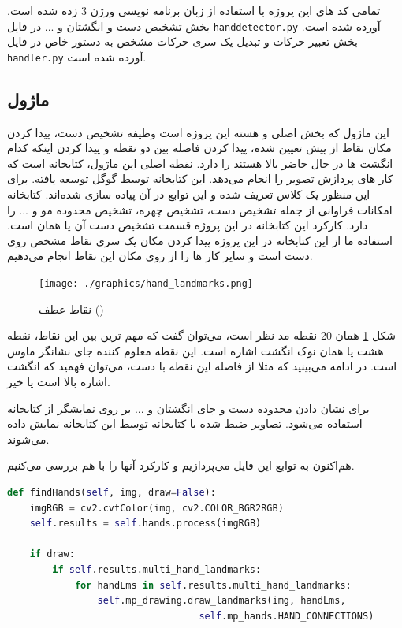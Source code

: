 \documentclass{article}
\begin{document}
تمامی کد های این پروژه با استفاده از زبان برنامه نویسی  ورژن 3 زده شده است. بخش تشخیص دست و انگشتان و ... در فایل
\verb~handdetector.py~
 آورده شده است. بخش تعبیر حرکات و تبدیل یک سری حرکات مشخص به دستور خاص در فایل 
 \verb~handler.py~
  آورده شده است.

\subsection{ماژول }
این ماژول که بخش اصلی و هسته این پروژه است وظیفه تشخیص دست، پیدا کردن مکان نقاط از پیش تعیین شده، پیدا کردن فاصله بین دو نقطه و پیدا کردن اینکه کدام انگشت ها در حال حاضر بالا هستند را دارد.
نقطه اصلی این ماژول، کتابخانه   است که کار های پردازش تصویر را انجام می‌دهد. این کتابخانه توسط گوگل توسعه یافته. برای این منظور یک کلاس  تعریف شده و این توابع در آن پیاده سازی شده‌اند.
کتابخانه  امکانات فراوانی از جمله تشخیص دست، تشخیص چهره، تشخیص محدوده مو و ... را دارد. کارکرد این کتابخانه در این پروژه قسمت تشخیص دست آن یا همان  است. استفاده ما از این کتابخانه در این پروژه پیدا کردن مکان یک سری نقاط مشخص روی دست است و سایر کار ها را از روی مکان این نقاط انجام می‌دهیم.

\begin{figure}
	\centering
	\texttt{[image: ./graphics/hand\_landmarks.png]}
	\caption{نقاط عطف ()}
	\label{landmark}
\end{figure}

شکل \ref{landmark} همان 20 نقطه مد نظر است، می‌توان گفت که مهم ترین بین این نقاط، نقطه هشت یا همان نوک انگشت اشاره است. این نقطه معلوم کننده جای نشانگر ماوس است. در ادامه می‌بینید که مثلا از فاصله این نقطه با دست، می‌توان فهمید که انگشت اشاره بالا است یا خیر.
\cite{medipipe}

برای نشان دادن محدوده دست و جای انگشتان و ... بر روی نمایشگر از کتابخانه  استفاده می‌شود. تصاویر ضبط شده با کتابخانه  توسط این کتابخانه نمایش داده می‌شوند. 
\cite{cv2}

هم‌اکنون به توابع این فایل می‌پردازیم و کارکرد آنها را با هم بررسی می‌کنیم.

\begin{latin}
\begin{lstlisting}[language=python]
def findHands(self, img, draw=False):
    imgRGB = cv2.cvtColor(img, cv2.COLOR_BGR2RGB)
    self.results = self.hands.process(imgRGB)

    if draw:
        if self.results.multi_hand_landmarks:
            for handLms in self.results.multi_hand_landmarks:
                self.mp_drawing.draw_landmarks(img, handLms,
                                  self.mp_hands.HAND_CONNECTIONS)
\end{lstlisting}
\end{latin}
\end{document}
